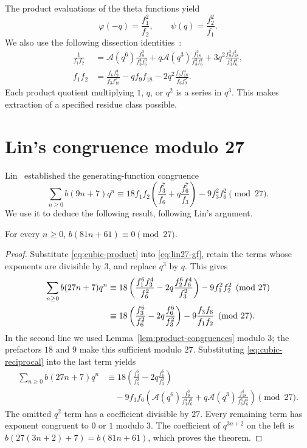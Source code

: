 The product evaluations of the theta functions yield
\[
 \varphi(-q)=\frac{f_1^2}{f_2},\qquad
 \psi(q)=\frac{f_2^2}{f_1}.
\]
We also use the following dissection identities~\cite{zhao1}:
\begin{align}
 \frac1{f_1f_2}
 &=\mathcal A(q^6)\frac{f_9^3}{f_3^4f_6^3}
   +q\mathcal A(q^3)\frac{f_{18}^3}{f_3^3f_6^4}
   +3q^2\frac{f_9^3f_{18}^3}{f_3^4f_6^4},\label{eq:cubic-reciprocal}\\
 f_1f_2&=\frac{f_6f_9^4}{f_3f_{18}^2}
   -qf_9f_{18}-2q^2\frac{f_3f_{18}^4}{f_6f_9^2}.
 \label{eq:cubic-product}
\end{align}
Each product quotient multiplying $1$, $q$, or $q^2$ is a series in $q^3$.
This makes extraction of a specified residue class possible.

\section{Lin's congruence modulo 27}
Lin~\cite{Lin2017} established the generating-function congruence
\begin{equation}\label{eq:lin27-gf}
 \sum_{n\ge0}b(9n+7)q^n
 \equiv18f_1f_2\left(\frac{f_3^7}{f_6}
      +q\frac{f_6^7}{f_3}\right)-9f_3^2f_6^2\pmod{27}.
\end{equation}
We use it to deduce the following result, following Lin's argument.
\begin{theorem}[Lin]\label{thm:lin27}
For every $n\ge0$, $b(81n+61)\equiv0\pmod{27}$.
\end{theorem}
\begin{proof}
Substitute \eqref{eq:cubic-product} into \eqref{eq:lin27-gf}, retain the
terms whose exponents are divisible by $3$, and replace $q^3$ by $q$.
This gives
\begin{align}
 \sum_{n\ge0}b(27n+7)q^n
 &\equiv18\left(\frac{f_1^6f_3^4}{f_6^2}
     -2q\frac{f_2^6f_6^4}{f_3^2}\right)-9f_1^2f_2^2
       \pmod{27}\notag\\
 &\equiv18\left(\frac{f_3^6}{f_6^2}
     -2q\frac{f_6^6}{f_3^2}\right)
     -9\frac{f_3f_6}{f_1f_2}\pmod{27}.
 \label{eq:b27-mod27}
\end{align}
In the second line we used Lemma~\ref{lem:product-congruences} modulo $3$;
the prefactors $18$ and $9$ make this sufficient modulo $27$.
Substituting \eqref{eq:cubic-reciprocal} into the last term yields
\begin{equation*}
\begin{split}
 \sum_{n\ge0}b(27n+7)q^n
 &\equiv18\left(\frac{f_3^6}{f_6^2}-2q\frac{f_6^6}{f_3^2}\right)\\
 &\quad-9f_3f_6\left(
 \mathcal A(q^6)\frac{f_9^3}{f_3^4f_6^3}
 +q\mathcal A(q^3)\frac{f_{18}^3}{f_3^3f_6^4}
 \right)\pmod{27}.
\end{split}
\end{equation*}
The omitted $q^2$ term has a coefficient divisible by $27$. Every
remaining term has exponent congruent to $0$ or $1$ modulo $3$.
The coefficient of $q^{3n+2}$ on the left is
$b(27(3n+2)+7)=b(81n+61)$, which proves the theorem.
\end{proof}

